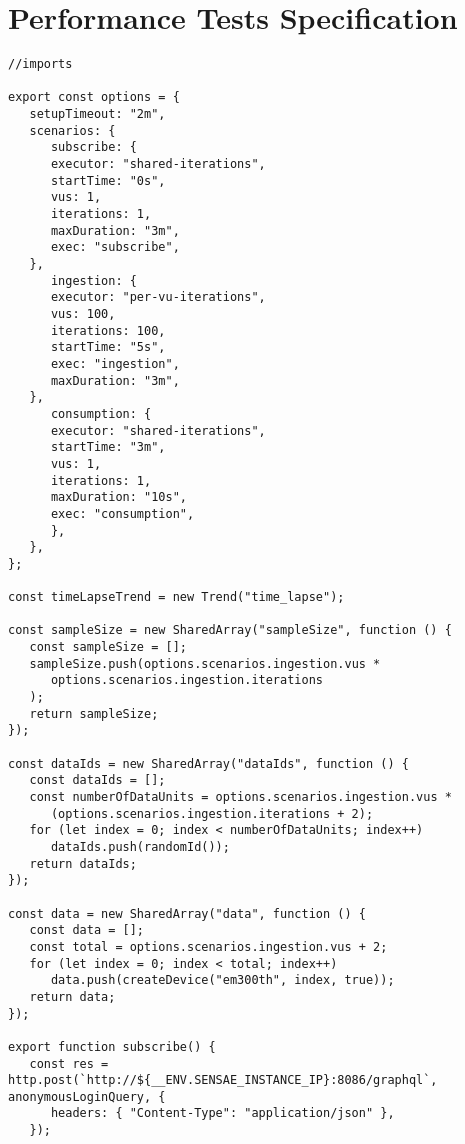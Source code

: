 \chapter{Performance Tests Specification}
\label{AppendixF}

\begin{lstlisting}[style=javascript,basicstyle=\tiny, caption=Smart Irrigation Performance Test Scenario Description, label={code:AppendixF:scenario1}]
//imports

export const options = {
   setupTimeout: "2m",
   scenarios: {
      subscribe: {
      executor: "shared-iterations",
      startTime: "0s",
      vus: 1,
      iterations: 1,
      maxDuration: "3m",
      exec: "subscribe",
   },
      ingestion: {
      executor: "per-vu-iterations",
      vus: 100,
      iterations: 100,
      startTime: "5s",
      exec: "ingestion",
      maxDuration: "3m",
   },
      consumption: {
      executor: "shared-iterations",
      startTime: "3m",
      vus: 1,
      iterations: 1,
      maxDuration: "10s",
      exec: "consumption",
      },
   },
};

const timeLapseTrend = new Trend("time_lapse");

const sampleSize = new SharedArray("sampleSize", function () {
   const sampleSize = [];
   sampleSize.push(options.scenarios.ingestion.vus * 
      options.scenarios.ingestion.iterations
   );
   return sampleSize;
});

const dataIds = new SharedArray("dataIds", function () {
   const dataIds = [];
   const numberOfDataUnits = options.scenarios.ingestion.vus *
      (options.scenarios.ingestion.iterations + 2);
   for (let index = 0; index < numberOfDataUnits; index++)
      dataIds.push(randomId());
   return dataIds;
});

const data = new SharedArray("data", function () {
   const data = [];
   const total = options.scenarios.ingestion.vus + 2;
   for (let index = 0; index < total; index++)
      data.push(createDevice("em300th", index, true));
   return data;
});

export function subscribe() {
   const res = http.post(`http://${__ENV.SENSAE_INSTANCE_IP}:8086/graphql`, anonymousLoginQuery, {
      headers: { "Content-Type": "application/json" },
   });


\end{lstlisting}
